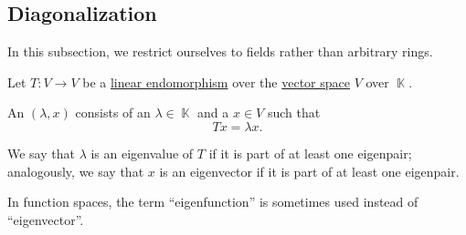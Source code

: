 \subsection{Diagonalization}\label{subsec:diagonalization}

In this subsection, we restrict ourselves to fields rather than arbitrary rings.

\begin{definition}\label{def:eigenpair}
  Let \( T: V \to V \) be a \hyperref[def:semimodule/homomorphism]{linear endomorphism} over the \hyperref[def:vector_space]{vector space} \( V \) over \( \BbbK \).

  An  \( (\lambda, x) \) consists of an  \( \lambda \in \BbbK \) and a   \( x \in V \) such that
  \begin{equation*}
    Tx = \lambda x.
  \end{equation*}

  We say that \( \lambda \) is an eigenvalue of \( T \) if it is part of at least one eigenpair; analogously, we say that \( x \) is an eigenvector if it is part of at least one eigenpair.

  In function spaces, the term \enquote{eigenfunction} is sometimes used instead of \enquote{eigenvector}.
\end{definition}

